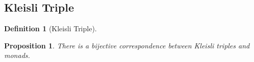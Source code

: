 \documentclass[a4paper]{article}
\theoremstyle{plain}
\newtheorem{proposition}[theorem]{Proposition}
\theoremstyle{definition}
\newtheorem{definition}[theorem]{Definition}
\DeclareMathOperator{\Obj}{Obj}
\newcommand{\cat}[1]{\mathcal{#1}}
\begin{document}
\subsection{Kleisli Triple}
\begin{definition}[Kleisli Triple]
\end{definition}

\begin{proposition}
    There is a bijective correspondence between Kleisli triples and monads.
\end{proposition}
\end{document}
